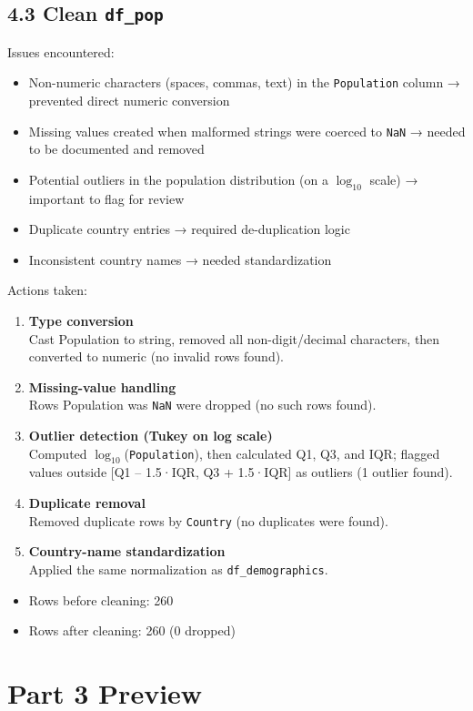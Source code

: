 \documentclass[14pt]{extarticle}
\begin{document}
\subsection*{4.3 Clean \texttt{df\_pop}}
Issues encountered:
\begin{itemize}
\item Non-numeric characters (spaces, commas, text) in the \texttt{Population} column
→ prevented direct numeric conversion
\item Missing values created when malformed strings were coerced to \texttt{NaN} →
needed to be documented and removed
\item Potential outliers in the population distribution (on a $\log_{10}$ scale) →
important to flag for review
\item Duplicate country entries → required de-duplication logic
\item Inconsistent country names → needed standardization
\end{itemize}
Actions taken:
\begin{enumerate}
\item \textbf{Type conversion}\\
Cast Population to string, removed all non-digit/decimal characters, then
converted to numeric (no invalid rows found).
\item \textbf{Missing-value handling}\\
  Rows Population was \texttt{NaN} were dropped (no such rows found).
\item \textbf{Outlier detection (Tukey on log scale)}\\
Computed $\log_{10}$(\texttt{Population}), then calculated Q1, Q3, and IQR; flagged
values outside [Q1 – 1.5·IQR, Q3 + 1.5·IQR] as outliers (1 outlier found).
\item \textbf{Duplicate removal}\\
  Removed duplicate rows by \texttt{Country} (no duplicates were found).
\item \textbf{Country-name standardization}\\
  Applied the same normalization as \texttt{df\_demographics}.
\end{enumerate}
\begin{itemize}
\item Rows before cleaning: 260
\item Rows after cleaning: 260 (0 dropped)
\end{itemize}

\section*{Part 3 Preview}
\end{document}
